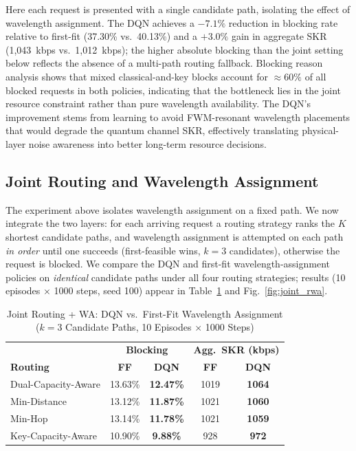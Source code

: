 \documentclass[conference]{IEEEtran}
\begin{document}
Here each request is presented with a single candidate path, isolating the effect of wavelength assignment.  The DQN achieves a \textbf{$-7.1\%$} reduction in blocking rate relative to first-fit (37.30\% vs.\ 40.13\%) and a \textbf{$+3.0\%$} gain in aggregate SKR (1{,}043~kbps vs.\ 1{,}012~kbps); the higher absolute blocking than the joint setting below reflects the absence of a multi-path routing fallback.  Blocking reason analysis shows that mixed classical-and-key blocks account for $\approx60\%$ of all blocked requests in both policies, indicating that the bottleneck lies in the joint resource constraint rather than pure wavelength availability. The DQN's improvement stems from learning to avoid FWM-resonant wavelength placements that would degrade the quantum channel SKR, effectively translating physical-layer noise awareness into better long-term resource decisions.

\subsection{Joint Routing and Wavelength Assignment}

The experiment above isolates wavelength assignment on a fixed path.  We now integrate the two layers: for each arriving request a routing strategy ranks the $K$ shortest candidate paths, and wavelength assignment is attempted on each path \emph{in order} until one succeeds (first-feasible wins, $k=3$ candidates), otherwise the request is blocked.  We compare the DQN and first-fit wavelength-assignment policies on \emph{identical} candidate paths under all four routing strategies; results (10 episodes $\times$ 1000 steps, seed 100) appear in Table~\ref{tab:joint_rwa} and Fig.~\ref{fig:joint_rwa}.

\begin{table}[htbp]
\caption{Joint Routing + WA: DQN vs.\ First-Fit Wavelength Assignment ($k=3$ Candidate Paths, 10 Episodes $\times$ 1000 Steps)}
\label{tab:joint_rwa}
\centering
\begin{tabular}{lcccc}
\hline
 & \multicolumn{2}{c}{\textbf{Blocking}} & \multicolumn{2}{c}{\textbf{Agg.\ SKR (kbps)}}\\
\textbf{Routing} & \textbf{FF} & \textbf{DQN} & \textbf{FF} & \textbf{DQN}\\
\hline
Dual-Capacity-Aware & 13.63\% & \textbf{12.47\%} & 1019 & \textbf{1064}\\
Min-Distance        & 13.12\% & \textbf{11.87\%} & 1021 & \textbf{1060}\\
Min-Hop             & 13.14\% & \textbf{11.78\%} & 1021 & \textbf{1059}\\
Key-Capacity-Aware  & 10.90\% & \textbf{9.88\%}  &  928 & \textbf{972}\\
\hline
\end{tabular}
\end{table}
\end{document}
